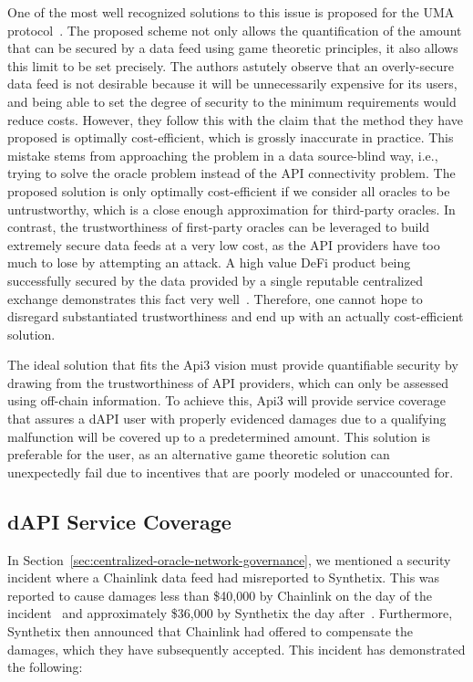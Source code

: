 \documentclass[11pt]{article}
\begin{document}
One of the most well recognized solutions to this issue is proposed for the UMA protocol~\cite{uma:2020}.
The proposed scheme not only allows the quantification of the amount that can be secured by a data feed using game theoretic principles, it also allows this limit to be set precisely.
The authors astutely observe that an overly-secure data feed is not desirable because it will be unnecessarily expensive for its users, and being able to set the degree of security to the minimum requirements would reduce costs.
However, they follow this with the claim that the method they have proposed is optimally cost-efficient, which is grossly inaccurate in practice.
This mistake stems from approaching the problem in a data source-blind way, i.e., trying to solve the oracle problem instead of the API connectivity problem.
The proposed solution is only optimally cost-efficient if we consider all oracles to be untrustworthy, which is a close enough approximation for third-party oracles.
In contrast, the trustworthiness of first-party oracles can be leveraged to build extremely secure data feeds at a very low cost, as the API providers have too much to lose by attempting an attack.
A high value DeFi product being successfully secured by the data provided by a single reputable centralized exchange demonstrates this fact very well~\cite{coinbase}.
Therefore, one cannot hope to disregard substantiated trustworthiness and end up with an actually cost-efficient solution.

The ideal solution that fits the Api3 vision must provide quantifiable security by drawing from the trustworthiness of API providers, which can only be assessed using off-chain information.
To achieve this, Api3 will provide service coverage that assures a dAPI user with properly evidenced damages due to a qualifying malfunction will be covered up to a predetermined amount.
This solution is preferable for the user, as an alternative game theoretic solution can unexpectedly fail due to incentives that are poorly modeled or unaccounted for.

\subsection{dAPI Service Coverage}
\label{sec:dapi-service-coverage}

In Section~\ref{sec:centralized-oracle-network-governance}, we mentioned a security incident where a Chainlink data feed had misreported to Synthetix.
This was reported to cause damages less than \$40,000 by Chainlink on the day of the incident~\cite{chainlink-fatfinger} and approximately \$36,000 by Synthetix the day after~\cite{synthetix-fatfinger}.
Furthermore, Synthetix then announced that Chainlink had offered to compensate the damages, which they have subsequently accepted.
This incident has demonstrated the following:
\end{document}

